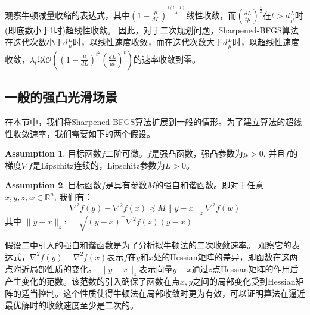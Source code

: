 \documentclass[a4paper,twoside,AutoFakeBold]{article}
\theoremstyle{definition}
\newtheorem{assumption}{Assumption}[section]
\begin{document}
观察牛顿减量收缩的表达式，其中$\left(1 - \frac{\mu}{dL}\right)^{\frac{t(t - 1)}{4}}$线性收敛，而$\left(\frac{dL}{t\mu}\right)^{\frac{t}{2}}$在$t>d\frac{L}{\mu}$时(即底数小于1时)超线性收敛。
因此，对于二次规划问题，Sharpened-BFGS算法在迭代次数小于$d\frac{L}{\mu}$时，以线性速度收敛，而在迭代次数大于$d\frac{L}{\mu}$时，以超线性速度收敛，$\lambda_t$以$\mathcal{O}((1-\frac{\mu}{dL})^{t^2} (\frac{dL}{\mu t})^t)$的速率收敛到零。


\subsection{一般的强凸光滑场景}

在本节中，我们将Sharpened-BFGS算法扩展到一般的情形。为了建立算法的超线性收敛速率，我们需要如下的两个假设。
\begin{assumption}\label{assumption:1}
    目标函数$f$二阶可微。$f$是强凸函数，强凸参数为$\mu>0$, 并且$f$的梯度$\nabla f$是Lipschitz连续的，Lipschitz参数为$L>0$。
\end{assumption}
\begin{assumption}\label{assumption:2}
    目标函数$f$是具有参数$M$的强自和谐函数。即对于任意$x,y,z,w\in \mathbb{R}^n$, 我们有：
    \begin{equation}
        \nabla^{2}{f(y)} - \nabla^{2}{f(x)} \preceq M\|y - x\|_{z}\nabla^{2}{f(w)}
    \end{equation}
    其中 $\|y - x\|_{z} : = \sqrt{(y - x)^\top \nabla^2{f(z)} (y - x)}$
\end{assumption}

假设二中引入的强自和谐函数是为了分析拟牛顿法的二次收敛速率。
观察它的表达式，$\nabla^{2}{f(y)} - \nabla^{2}{f(x)}$表示$f$在$y$和$x$处的Hessian矩阵的差异，即函数在这两点附近局部性质的变化。
$\|y - x\|_{z}$表示向量$y-x$通过$z$点Hessian矩阵的作用后产生变化的范数。该范数的引入确保了函数在点$x,y$之间的局部变化受到Hessian矩阵的适当控制。这个性质使得牛顿法在局部收敛时更为有效，可以证明算法在逼近最优解时的收敛速度至少是二次的。
\end{document}
